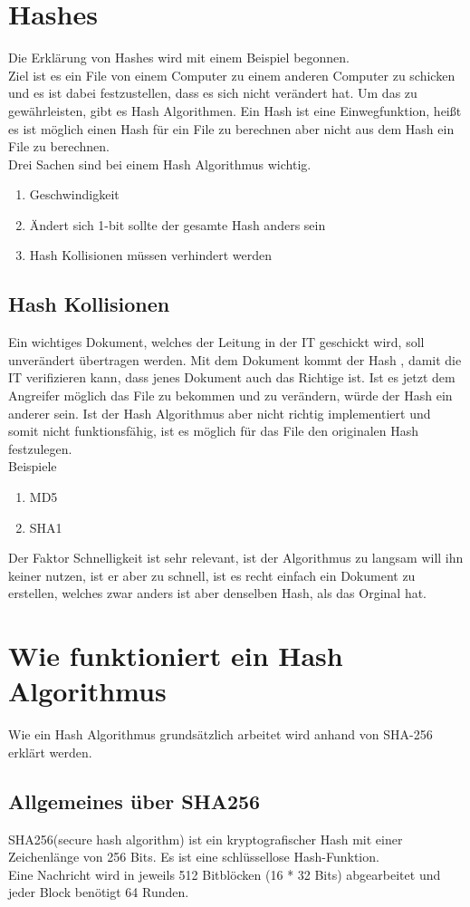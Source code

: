 {\section{Hashes}
\label{hash-expl}
Die Erklärung von Hashes wird mit einem Beispiel begonnen.\\Ziel ist es ein File von einem Computer zu einem anderen Computer zu schicken und es ist dabei festzustellen, dass es sich nicht verändert hat. Um das zu gewährleisten, gibt es Hash Algorithmen. Ein Hash ist eine Einwegfunktion, heißt es ist möglich einen Hash für ein File zu berechnen aber nicht aus dem Hash ein File zu berechnen.\\
Drei Sachen sind bei einem Hash Algorithmus wichtig.
\begin{enumerate}
\item Geschwindigkeit
\item Ändert sich 1-bit sollte der gesamte Hash anders sein
\item Hash Kollisionen müssen verhindert werden
\end{enumerate}
\subsection{Hash Kollisionen}
\label{sec:hash_coll}
Ein wichtiges Dokument, welches der Leitung in der IT geschickt wird, soll unverändert übertragen werden. Mit dem Dokument kommt der Hash , damit die IT verifizieren kann, dass jenes Dokument auch das Richtige ist. Ist es jetzt dem Angreifer möglich das File zu bekommen und zu verändern, würde der Hash ein anderer sein. Ist der Hash Algorithmus aber nicht richtig implementiert und somit nicht funktionsfähig, ist es möglich für das File den originalen Hash festzulegen.
\\
Beispiele
\begin{enumerate}
\item MD5
\item SHA1
\end{enumerate}
Der Faktor Schnelligkeit ist sehr relevant, ist der Algorithmus zu langsam will ihn keiner nutzen, ist er aber zu schnell, ist es recht einfach ein Dokument zu erstellen, welches zwar anders ist aber denselben Hash, als das Orginal hat.
\section{Wie funktioniert ein Hash Algorithmus}
\label{sec:hash_algo}
Wie ein Hash Algorithmus grundsätzlich arbeitet wird anhand von SHA-256 erklärt werden. 
\subsection{Allgemeines über SHA256}
\label{sec:hash_sha}
SHA256(secure hash algorithm) ist ein kryptografischer Hash mit einer Zeichenlänge von 256 Bits. Es ist eine schlüssellose Hash-Funktion.
\\
Eine Nachricht wird in jeweils 512 Bitblöcken (16 * 32 Bits) abgearbeitet und jeder Block benötigt 64 Runden.
}
